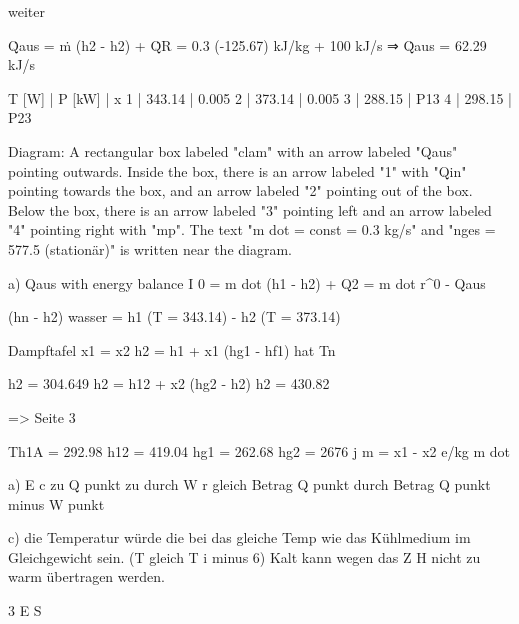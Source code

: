 weiter

Q̇aus = ṁ (h2 - h2) + Q̇R
= 0.3 (-125.67) kJ/kg + 100 kJ/s ⇒ Q̇aus = 62.29 kJ/s

T [W] | P [kW] | x  
1 | 343.14 | 0.005  
2 | 373.14 | 0.005  
3 | 288.15 | P13  
4 | 298.15 | P23  

Diagram:  
A rectangular box labeled "clam" with an arrow labeled "Qaus" pointing outwards. Inside the box, there is an arrow labeled "1" with "Qin" pointing towards the box, and an arrow labeled "2" pointing out of the box. Below the box, there is an arrow labeled "3" pointing left and an arrow labeled "4" pointing right with "mp". The text "m dot = const = 0.3 kg/s" and "nges = 577.5 (stationär)" is written near the diagram.

a) Qaus with energy balance I  
0 = m dot (h1 - h2) + Q2 = m dot r^0 - Qaus  

(hn - h2) wasser = h1 (T = 343.14) - h2 (T = 373.14)  

Dampftafel x1 = x2  
h2 = h1 + x1 (hg1 - hf1) hat Tn  

h2 = 304.649  
h2 = h12 + x2 (hg2 - h2)  
h2 = 430.82  

=> Seite 3  

Th1A = 292.98 h12 = 419.04  
hg1 = 262.68 hg2 = 2676 j m = x1 - x2  
e/kg  
m dot

a) E c zu Q punkt zu durch W r gleich Betrag Q punkt durch Betrag Q punkt minus W punkt

c) die Temperatur würde die bei das gleiche Temp wie das Kühlmedium im Gleichgewicht sein. (T gleich T i minus 6) Kalt kann wegen das Z H nicht zu warm übertragen werden. 

3 E S